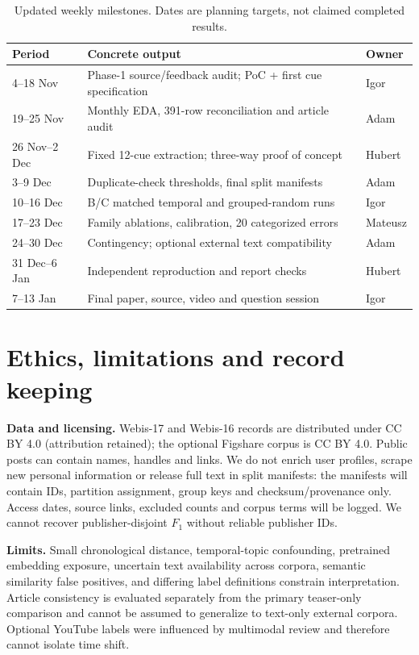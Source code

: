 \documentclass[11pt]{article}
\begin{document}
\begin{table}[t]
\centering\scriptsize\setlength{\tabcolsep}{3pt}
\caption{Updated weekly milestones. Dates are planning targets, not claimed completed results.}\label{tab:weekly}
\begin{tabularx}{\columnwidth}{@{}p{1.5cm}X p{1.10cm}@{}}\toprule
Period & Concrete output & Owner\\\midrule
4--18 Nov & Phase-1 source/feedback audit; PoC + first cue specification & Igor\\
19--25 Nov & Monthly EDA, 391-row reconciliation and article audit & Adam\\
26 Nov--2 Dec & Fixed 12-cue extraction; three-way proof of concept & Hubert\\
3--9 Dec & Duplicate-check thresholds, final split manifests & Adam\\
10--16 Dec & B/C matched temporal and grouped-random runs & Igor\\
17--23 Dec & Family ablations, calibration, 20 categorized errors & Mateusz\\
24--30 Dec & Contingency; optional external text compatibility & Adam\\
31 Dec--6 Jan & Independent reproduction and report checks & Hubert\\
7--13 Jan & Final paper, source, video and question session & Igor\\\bottomrule
\end{tabularx}
\end{table}

\section{Ethics, limitations and record keeping}
\textbf{Data and licensing.} Webis-17 and Webis-16 records are distributed under CC BY 4.0 (attribution retained); the optional Figshare corpus is CC BY 4.0. Public posts can contain names, handles and links. We do not enrich user profiles, scrape new personal information or release full text in split manifests: the manifests will contain IDs, partition assignment, group keys and checksum/provenance only. Access dates, source links, excluded counts and corpus terms will be logged. We cannot recover publisher-disjoint $F_1$ without reliable publisher IDs.

\textbf{Limits.} Small chronological distance, temporal-topic confounding, pretrained embedding exposure, uncertain text availability across corpora, semantic similarity false positives, and differing label definitions constrain interpretation. Article consistency is evaluated separately from the primary teaser-only comparison and cannot be assumed to generalize to text-only external corpora. Optional YouTube labels were influenced by multimodal review and therefore cannot isolate time shift.
\end{document}
